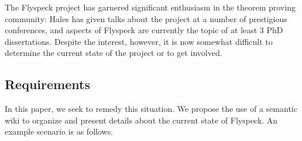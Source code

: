 The Flyspeck project has garnered significant enthusiasm in the theorem proving
community: Hales has given talks about the project at a number of
prestigious conferences, and aspects of Flyspeck are currently the topic of at least
3 PhD dissertations.  Despite the interest, however, it is now somewhat difficult to 
determine the current state of the project or to get involved.  



\subsection{Requirements}
In this paper, we seek to remedy this situation.  We propose the use of a 
semantic wiki to organize and present details about the current state of Flyspeck.
An example scenario is as follows.  





